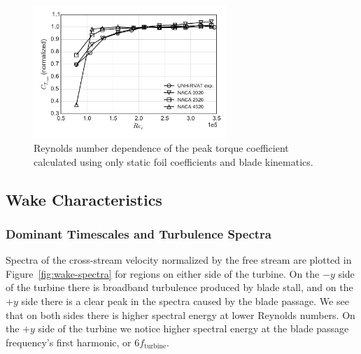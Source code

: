 \documentclass[energies,article,accept,moreauthors,pdftex,12pt,a4paper]{mdpi}
\begin{document}
\begin{figure}[ht!]
\centering
\includegraphics[width=0.65\textwidth]{figures/cft_re_dep_foils}
\caption{Reynolds number dependence of the peak torque coefficient calculated using 
only static foil coefficients and blade kinematics.}
\label{fig:foils-C_T-Re-dep}
\end{figure}


\subsection{Wake Characteristics}






\subsubsection{Dominant Timescales and Turbulence Spectra}

Spectra of the cross-stream velocity normalized by the free stream are plotted
in Figure~\ref{fig:wake-spectra} for regions on either side of the turbine. On
the $-y$ side of the turbine there is broadband turbulence produced by blade
stall, and on the $+y$ side there is a clear peak in the spectra caused by the
blade passage. We see that on both sides there is higher spectral energy at
lower Reynolds numbers. On the $+y$ side of the turbine we notice higher
spectral energy at the blade passage frequency's first harmonic, or $6
f_\mathrm{turbine}$.


\end{document}
